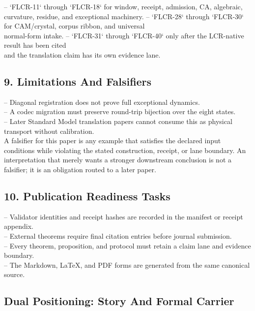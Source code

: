 \documentclass[11pt]{article}
\begin{document}
\noindent{}-- `FLCR-11` through `FLCR-18` for window, receipt, admission, CA, algebraic,\\
  curvature, residue, and exceptional machinery.
\noindent{}-- `FLCR-28` through `FLCR-30` for CAM/crystal, corpus ribbon, and universal\\
  normal-form intake.
\noindent{}-- `FLCR-31` through `FLCR-40` only after the LCR-native result has been cited\\
  and the translation claim has its own evidence lane.

\subsection*{9. Limitations And Falsifiers}

\noindent{}-- Diagonal registration does not prove full exceptional dynamics.\\
\noindent{}-- A codec migration must preserve round-trip bijection over the eight states.\\
\noindent{}-- Later Standard Model translation papers cannot consume this as physical transport without calibration.\\

A falsifier for this paper is any example that satisfies the declared input
conditions while violating the stated construction, receipt, or lane boundary.
An interpretation that merely wants a stronger downstream conclusion is not a
falsifier; it is an obligation routed to a later paper.

\subsection*{10. Publication Readiness Tasks}

\noindent{}-- Validator identities and receipt hashes are recorded in the manifest or receipt appendix.\\
\noindent{}-- External theorems require final citation entries before journal submission.\\
\noindent{}-- Every theorem, proposition, and protocol must retain a claim lane and evidence boundary.\\
\noindent{}-- The Markdown, LaTeX, and PDF forms are generated from the same canonical source.\\

\subsection*{Dual Positioning: Story And Formal Carrier}
\end{document}
